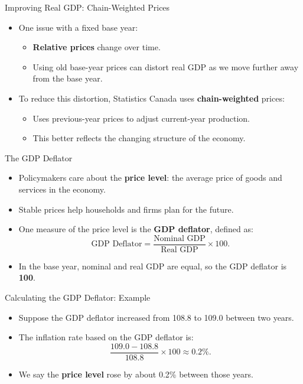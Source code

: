 \documentclass[aspectratio=169]{beamer}
\begin{document}
\begin{frame}{Improving Real GDP: Chain-Weighted Prices}
\transfade
\begin{itemize}[<+->]
  \item One issue with a fixed base year:
  \begin{itemize}[<+->]
    \item \textbf{Relative prices} change over time.
    \item Using old base-year prices can distort real GDP as we move further away from the base year.
  \end{itemize}
  \item To reduce this distortion, Statistics Canada uses \textbf{chain-weighted} prices:
  \begin{itemize}[<+->]
    \item Uses previous-year prices to adjust current-year production.
    \item This better reflects the changing structure of the economy.
  \end{itemize}
\end{itemize}
\end{frame}


\begin{frame}{The GDP Deflator}
\transfade
\begin{itemize}[<+->]
  \item Policymakers care about the \textbf{price level}: the average price of goods and services in the economy.
  \item Stable prices help households and firms plan for the future.
  \item One measure of the price level is the \textbf{GDP deflator}, defined as:
  \[
    \text{GDP Deflator} = \frac{\text{Nominal GDP}}{\text{Real GDP}} \times 100.
  \]
  \item In the base year, nominal and real GDP are equal, so the GDP deflator is \textbf{100}.
\end{itemize}
\end{frame}

\begin{frame}{Calculating the GDP Deflator: Example}
\transfade
\begin{itemize}[<+->]
  \item Suppose the GDP deflator increased from 108.8 to 109.0 between two years.
  \item The inflation rate based on the GDP deflator is:
  \[
    \frac{109.0 - 108.8}{108.8} \times 100 \approx 0.2\%.
  \]
  \item We say the \textbf{price level} rose by about 0.2\% between those years.
\end{itemize}
\end{frame}
\end{document}
